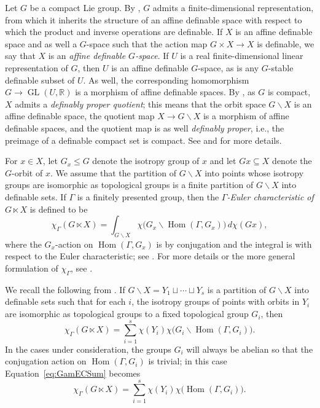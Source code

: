 \documentclass[twoside]{amsart}
\theoremstyle{definition}
\theoremstyle{remark}
\numberwithin{equation}{section}
\newcommand{\R}{\mathbb{R}}
\newcommand{\GL}{\operatorname{GL}}
\newcommand{\HOM}{\operatorname{Hom}}
\begin{document}
Let $G$ be a compact Lie group. By \cite[Ch.~VI, Sec.~XII, Thrm.~4]{ChevalleyThryLieGrps}, $G$ admits a finite-dimensional representation, from which it inherits the
structure of an affine definable space with respect to which the product and inverse operations are definable.
If $X$ is an affine definable space and as well a $G$-space such that the action map $G\times X\to X$ is definable, we say that $X$ is an \emph{ affine definable $G$-space}.
If $U$ is a real finite-dimensional linear representation of $G$, then $U$ is an affine definable $G$-space, as is any $G$-stable definable subset of $U$. As well,
the corresponding homomorphism $G\to\GL(U,\R)$ is a morphism of affine definable spaces.
By \cite[Ch.~10, Cor.~2.18]{vandenDriesBook}, as $G$ is compact, $X$ admits a \emph{definably proper quotient}; this means that the orbit space $G\backslash X$
is an affine definable space, the quotient map $X\to G\backslash X$ is a morphism of affine definable spaces, and the quotient map is as well \emph{definably proper},
i.e., the preimage of a definable compact set is compact. See \cite[Sec.~10.2]{vandenDriesBook} and \cite[Sec.~2.2]{FarSeaJLMS} for more details.

For $x\in X$, let $G_x\leq G$ denote the isotropy group of $x$ and let $Gx\subseteq X$ denote the $G$-orbit of $x$.
We assume that the partition of $G\backslash X$ into points whose isotropy groups are isomorphic as topological groups is a finite partition
of $G\backslash X$ into definable sets. If $\Gamma$ is a finitely presented group, then the \emph{$\Gamma$-Euler characteristic of $G\ltimes X$}
is defined to be
\begin{equation}
\label{eq:DefGamEC}
    \chi_\Gamma(G\ltimes X)
    =
    \int_{G\backslash X} \chi\big(G_x\backslash\HOM(\Gamma,G_x)\big) \, d\chi(G x),
\end{equation}
where the $G_x$-action on $\HOM(\Gamma,G_x)$ is by conjugation and the integral is with respect to the Euler characteristic;
see \cite{ViroIntegralEulerChar}.
For more details or the more general formulation of $\chi_\Gamma$, see \cite[Def.~3.8]{FarSeaJLMS}.

We recall the following from \cite[Eq.~(2.3)]{FarsiMeitSeaton}.
If $G\backslash X = Y_1\sqcup\cdots\sqcup Y_s$ is a partition of $G\backslash X$ into definable sets such that for each $i$, the isotropy groups of
points with orbits in $Y_i$ are isomorphic as topological groups to a fixed topological group $G_i$, then
\begin{equation}
\label{eq:GamECSum}
    \chi_\Gamma(G\ltimes X)
    =
    \sum\limits_{i=1}^s \chi(Y_i)\chi\big(G_i\backslash\HOM(\Gamma, G_i)\big).
\end{equation}
In the cases under consideration, the groups $G_i$ will always be abelian so that the conjugation action on $\HOM(\Gamma, G_i)$ is trivial;
in this case Equation~\eqref{eq:GamECSum} becomes
\begin{equation}
\label{eq:GamECSumAbel}
    \chi_\Gamma(G\ltimes X)
    =
    \sum\limits_{i=1}^s \chi(Y_i)\chi\big(\HOM(\Gamma, G_i)\big).
\end{equation}
\end{document}

